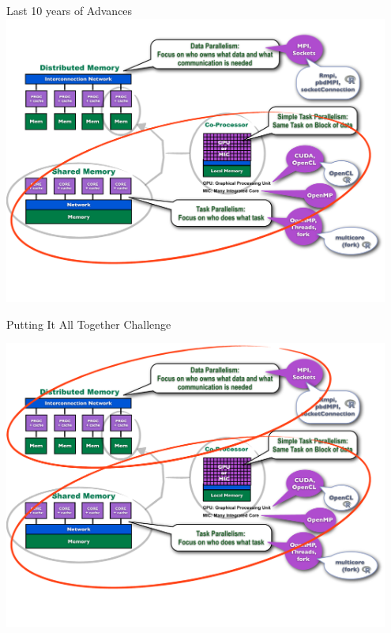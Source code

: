 \begin{frame}
\begin{block}{Last 10 years of Advances}
    \includegraphics[width=0.95\textwidth]{../common/pics/ParallelHardware9.pdf}
\end{block}
\end{frame}

\begin{frame}
\begin{block}{Putting It All Together Challenge}
    
\includegraphics[width=0.95\textwidth]{../common/pics/ParallelHardware10.pdf}
\end{block}
\end{frame}


